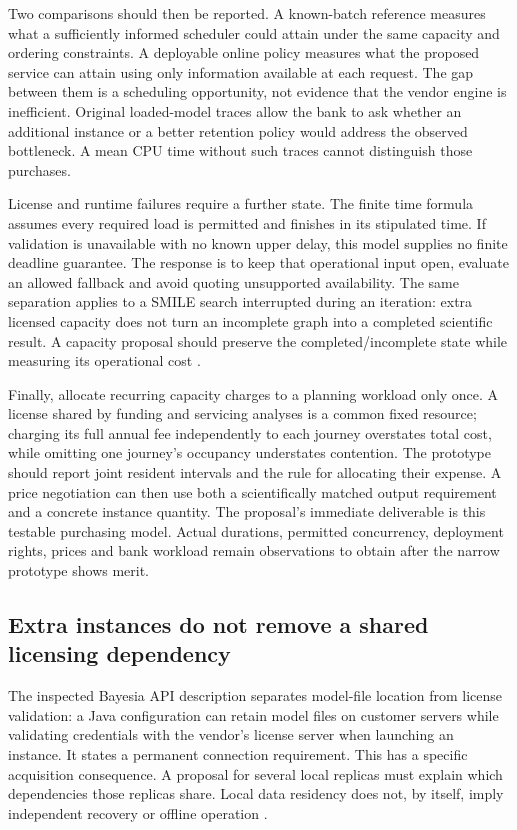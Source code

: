 Two comparisons should then be reported. A known-batch reference measures
what a sufficiently informed scheduler could attain under the same capacity
and ordering constraints. A deployable online policy measures what the
proposed service can attain using only information available at each request.
The gap between them is a scheduling opportunity, not evidence that the vendor
engine is inefficient. Original loaded-model traces allow the bank to ask
whether an additional instance or a better retention policy would address the
observed bottleneck. A mean CPU time without such traces cannot distinguish
those purchases.

License and runtime failures require a further state. The finite time formula
assumes every required load is permitted and finishes in its stipulated time.
If validation is unavailable with no known upper delay, this model supplies
no finite deadline guarantee. The response is to keep that operational input
open, evaluate an allowed fallback and avoid quoting unsupported availability.
The same separation applies to a SMILE search interrupted during an iteration:
extra licensed capacity does not turn an incomplete graph into a completed
scientific result. A capacity proposal should preserve the completed/incomplete
state while measuring its operational cost \citep{exec13_smile_pc}.

Finally, allocate recurring capacity charges to a planning workload only once.
A license shared by funding and servicing analyses is a common fixed resource;
charging its full annual fee independently to each journey overstates total
cost, while omitting one journey's occupancy understates contention. The
prototype should report joint resident intervals and the rule for allocating
their expense. A price negotiation can then use both a scientifically matched
output requirement and a concrete instance quantity. The proposal's immediate
deliverable is this testable purchasing model. Actual durations, permitted
concurrency, deployment rights, prices and bank workload remain observations
to obtain after the narrow prototype shows merit.


\subsection{Extra instances do not remove a shared licensing dependency}
\label{exec17:s8-availability}

The inspected Bayesia API description separates model-file location from
license validation: a Java configuration can retain model files on customer
servers while validating credentials with the vendor's license server when
launching an instance. It states a permanent connection requirement. This
has a specific acquisition consequence. A proposal for several local replicas
must explain which dependencies those replicas share. Local data residency
does not, by itself, imply independent recovery or offline operation
\citep{exec13_bayesia_api}.

